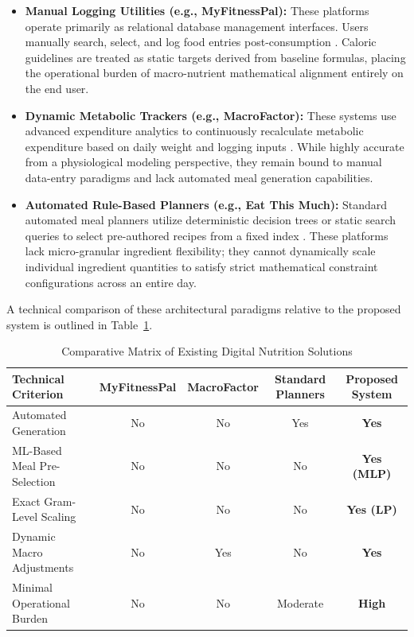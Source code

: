 \begin{itemize}
    \item \textbf{Manual Logging Utilities (e.g., MyFitnessPal):} These platforms operate 
    primarily as relational database management interfaces. Users manually search, select, 
    and log food entries post-consumption \cite{url:myfitnesspal}. Caloric guidelines are 
    treated as static targets derived from baseline formulas, placing the operational burden 
    of macro-nutrient mathematical alignment entirely on the end user.
    \item \textbf{Dynamic Metabolic Trackers (e.g., MacroFactor):} These systems use advanced 
    expenditure analytics to continuously recalculate metabolic expenditure based on daily 
    weight and logging inputs \cite{url:macrofactor}. While highly accurate from a 
    physiological modeling perspective, they remain bound to manual data-entry paradigms and 
    lack automated meal generation capabilities.
    \item \textbf{Automated Rule-Based Planners (e.g., Eat This Much):} 
    Standard automated meal planners utilize deterministic decision trees or 
    static search queries to select pre-authored recipes from a fixed 
    index \cite{url:eatthismuch}. These platforms lack micro-granular ingredient 
    flexibility; they cannot dynamically scale individual ingredient quantities 
    to satisfy strict mathematical constraint configurations across an entire day.
\end{itemize}

A technical comparison of these architectural paradigms relative to the proposed system 
is outlined in Table~\ref{tab:comparative_analysis}.

\begin{table}[!htbp]
\centering
\caption{Comparative Matrix of Existing Digital Nutrition Solutions}
\label{tab:comparative_analysis}
\begin{tabular}{|l|c|c|c|c|}
\hline
\textbf{Technical Criterion} & \textbf{MyFitnessPal} & \textbf{MacroFactor} & \textbf{Standard Planners} & \textbf{Proposed System} \\ \hline
Automated Generation        & No                    & No                   & Yes                        & \textbf{Yes}             \\ \hline
ML-Based Meal Pre-Selection & No                    & No                   & No                         & \textbf{Yes (MLP)}       \\ \hline
Exact Gram-Level Scaling    & No                    & No                   & No                         & \textbf{Yes (LP)}        \\ \hline
Dynamic Macro Adjustments   & No                    & Yes                  & No                         & \textbf{Yes}             \\ \hline
Minimal Operational Burden  & No                    & No                   & Moderate                   & \textbf{High}            \\ \hline
\end{tabular}
\end{table}

